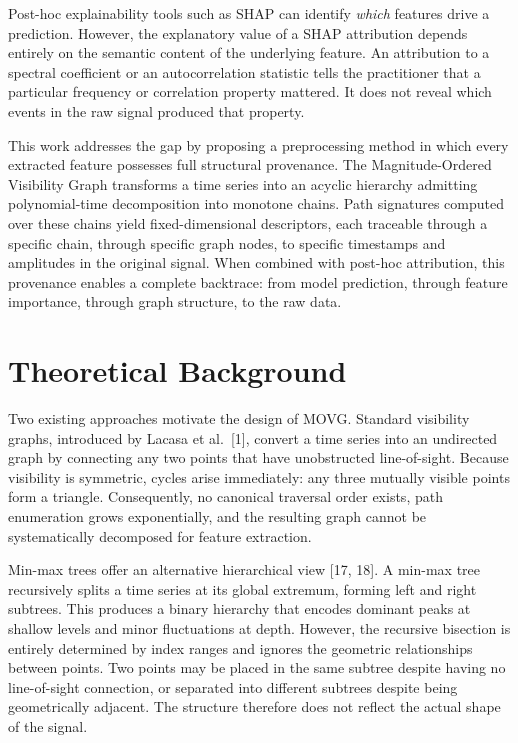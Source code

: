 \documentclass[a4paper,12pt]{article}
\begin{document}
Post-hoc explainability tools such as SHAP can identify \emph{which} features drive a prediction. However, the explanatory value of a SHAP attribution depends entirely on the semantic content of the underlying feature. An attribution to a spectral coefficient or an autocorrelation statistic tells the practitioner that a particular frequency or correlation property mattered. It does not reveal which events in the raw signal produced that property.

This work addresses the gap by proposing a preprocessing method in which every extracted feature possesses full structural provenance. The Magnitude-Ordered Visibility Graph transforms a time series into an acyclic hierarchy admitting polynomial-time decomposition into monotone chains. Path signatures computed over these chains yield fixed-dimensional descriptors, each traceable through a specific chain, through specific graph nodes, to specific timestamps and amplitudes in the original signal. When combined with post-hoc attribution, this provenance enables a complete backtrace: from model prediction, through feature importance, through graph structure, to the raw data.

\section{Theoretical Background}
\label{sec:theory}

Two existing approaches motivate the design of MOVG. Standard visibility graphs, introduced by Lacasa et al.\ [1], convert a time series into an undirected graph by connecting any two points that have unobstructed line-of-sight. Because visibility is symmetric, cycles arise immediately: any three mutually visible points form a triangle. Consequently, no canonical traversal order exists, path enumeration grows exponentially, and the resulting graph cannot be systematically decomposed for feature extraction.

Min-max trees offer an alternative hierarchical view [17, 18]. A min-max tree recursively splits a time series at its global extremum, forming left and right subtrees. This produces a binary hierarchy that encodes dominant peaks at shallow levels and minor fluctuations at depth. However, the recursive bisection is entirely determined by index ranges and ignores the geometric relationships between points. Two points may be placed in the same subtree despite having no line-of-sight connection, or separated into different subtrees despite being geometrically adjacent. The structure therefore does not reflect the actual shape of the signal.
\end{document}
